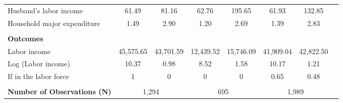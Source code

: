 \begin{center}
{\begin{longtable}{lccccccc}
Husband's labor income &   61.49  &  81.16  & 62.76 & 195.65 & 61.93 & 132.85  \\
Household major expenditure  &   1.49 &   2.90   & 1.20 & 2.69 & 1.39 & 2.83 \\
\\
\textbf{Outcomes}\\
\hline
Labor income &      45,575.65&      43,701.59&      12,439.52&     15,746.09 &      41,909.04 &  42,822.50 \\
Log (Labor income)&       10.37&       0.98&       8.52&       1.58 &       10.17&       1.21 \\
If in the labor force  &       1     &        0    &      0      &     0       &       0.65 &   0.48  \\
\\
\textbf{Number of Observations (N)}&       \multicolumn{2}{c}{1,294}            &       \multicolumn{2}{c}{695}            &       \multicolumn{2}{c}{1,989}                      \\
\hline \hline
\end{longtable}
}
\end{center}


